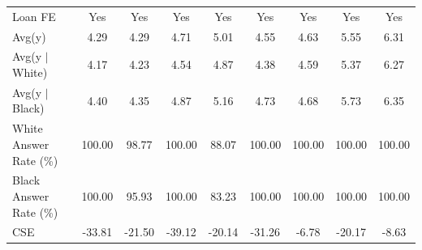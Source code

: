 {\begin{tabular}{l*{8}{c}}
Loan FE         &      Yes         &      Yes         &      Yes         &      Yes         &      Yes         &      Yes         &      Yes         &      Yes         \\
Avg(y)          &     4.29         &     4.29         &     4.71         &     5.01         &     4.55         &     4.63         &     5.55         &     6.31         \\
Avg(y $|$ White)&     4.17         &     4.23         &     4.54         &     4.87         &     4.38         &     4.59         &     5.37         &     6.27         \\
Avg(y $|$ Black)&     4.40         &     4.35         &     4.87         &     5.16         &     4.73         &     4.68         &     5.73         &     6.35         \\
White Answer Rate (\%)&   100.00         &    98.77         &   100.00         &    88.07         &   100.00         &   100.00         &   100.00         &   100.00         \\
Black Answer Rate (\%)&   100.00         &    95.93         &   100.00         &    83.23         &   100.00         &   100.00         &   100.00         &   100.00         \\
CSE             &   -33.81         &   -21.50         &   -39.12         &   -20.14         &   -31.26         &    -6.78         &   -20.17         &    -8.63         \\
\bottomrule
\end{tabular}
}
